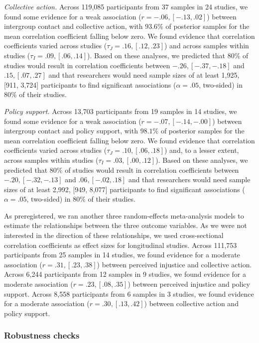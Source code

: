 \documentclass[twocolumn, 10pt, letterpaper]{article}
\begin{document}
\emph{Collective action.} Across 119,085 participants from 37 samples in
24 studies, we found some evidence for a weak association
(\(r = -.06, [-.13, .02]\)) between intergroup contact and collective
action, with \(93.6\%\) of posterior samples for the mean correlation
coefficient falling below zero. We found evidence that correlation
coefficients varied across studies (\(\tau_J = .16, [.12, .23]\)) and
across samples within studies (\(\tau_I = .09, [.06, .14]\)). Based on
these analyses, we predicted that 80\% of studies would result in
correlation coefficients between \(-.26, [-.37, -.18]\) and
\(.15, [.07, .27]\) and that researchers would need sample sizes of at
least 1,925, {[}911, 3,724{]} participants to find significant
associations (\(\alpha = .05\), two-sided) in 80\% of their studies.

\emph{Policy support.} Across 13,703 participants from 19 samples in 14
studies, we found some evidence for a weak association
(\(r = -.07, [-.14, -.00]\)) between intergroup contact and policy
support, with \(98.1\%\) of posterior samples for the mean correlation
coefficient falling below zero. We found evidence that correlation
coefficients varied across studies (\(\tau_J = .10, [.06, .18]\)) and,
to a lesser extent, across samples within studies
(\(\tau_I = .03, [.00, .12]\)). Based on these analyses, we predicted
that 80\% of studies would result in correlation coefficients between
\(-.20, [-.32, -.13]\) and \(.06, [-.02, .18]\) and that researchers
would need sample sizes of at least 2,992, {[}949, 8,077{]} participants
to find significant associations (\(\alpha = .05\), two-sided) in 80\%
of their studies.

As preregistered, we ran another three random-effects meta-analysis
models to estimate the relationships between the three outcome
variables. As we were not interested in the direction of these
relationships, we used cross-sectional correlation coefficients as
effect sizes for longitudinal studies. Across 111,753 participants from
25 samples in 14 studies, we found evidence for a moderate association
(\(r = .31, [.23, .38]\)) between perceived injustice and collective
action. Across 6,244 participants from 12 samples in 9 studies, we found
evidence for a moderate association (\(r = .23, [.08, .35]\)) between
perceived injustice and policy support. Across 8,558 participants from 6
samples in 3 studies, we found evidence for a moderate association
(\(r = .30, [.13, .42]\)) between collective action and policy support.

\hypertarget{robustness-checks}{%
\subsubsection{Robustness checks}\label{robustness-checks}}
\end{document}
